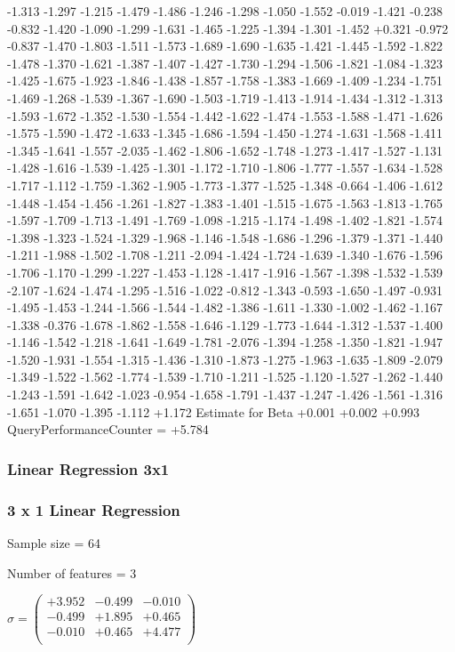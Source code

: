 \documentclass[9pt]{article}
\theoremstyle{plain}
\theoremstyle{definition}
\theoremstyle{remark}
\numberwithin{equation}{section}
\begin{document}
-1.313
-1.297
-1.215
-1.479
-1.486
-1.246
-1.298
-1.050
-1.552
-0.019
-1.421
-0.238
-0.832
-1.420
-1.090
-1.299
-1.631
-1.465
-1.225
-1.394
-1.301
-1.452
+0.321
-0.972
-0.837
-1.470
-1.803
-1.511
-1.573
-1.689
-1.690
-1.635
-1.421
-1.445
-1.592
-1.822
-1.478
-1.370
-1.621
-1.387
-1.407
-1.427
-1.730
-1.294
-1.506
-1.821
-1.084
-1.323
-1.425
-1.675
-1.923
-1.846
-1.438
-1.857
-1.758
-1.383
-1.669
-1.409
-1.234
-1.751
-1.469
-1.268
-1.539
-1.367
-1.690
-1.503
-1.719
-1.413
-1.914
-1.434
-1.312
-1.313
-1.593
-1.672
-1.352
-1.530
-1.554
-1.442
-1.622
-1.474
-1.553
-1.588
-1.471
-1.626
-1.575
-1.590
-1.472
-1.633
-1.345
-1.686
-1.594
-1.450
-1.274
-1.631
-1.568
-1.411
-1.345
-1.641
-1.557
-2.035
-1.462
-1.806
-1.652
-1.748
-1.273
-1.417
-1.527
-1.131
-1.428
-1.616
-1.539
-1.425
-1.301
-1.172
-1.710
-1.806
-1.777
-1.557
-1.634
-1.528
-1.717
-1.112
-1.759
-1.362
-1.905
-1.773
-1.377
-1.525
-1.348
-0.664
-1.406
-1.612
-1.448
-1.454
-1.456
-1.261
-1.827
-1.383
-1.401
-1.515
-1.675
-1.563
-1.813
-1.765
-1.597
-1.709
-1.713
-1.491
-1.769
-1.098
-1.215
-1.174
-1.498
-1.402
-1.821
-1.574
-1.398
-1.323
-1.524
-1.329
-1.968
-1.146
-1.548
-1.686
-1.296
-1.379
-1.371
-1.440
-1.211
-1.988
-1.502
-1.708
-1.211
-2.094
-1.424
-1.724
-1.639
-1.340
-1.676
-1.596
-1.706
-1.170
-1.299
-1.227
-1.453
-1.128
-1.417
-1.916
-1.567
-1.398
-1.532
-1.539
-2.107
-1.624
-1.474
-1.295
-1.516
-1.022
-0.812
-1.343
-0.593
-1.650
-1.497
-0.931
-1.495
-1.453
-1.244
-1.566
-1.544
-1.482
-1.386
-1.611
-1.330
-1.002
-1.462
-1.167
-1.338
-0.376
-1.678
-1.862
-1.558
-1.646
-1.129
-1.773
-1.644
-1.312
-1.537
-1.400
-1.146
-1.542
-1.218
-1.641
-1.649
-1.781
-2.076
-1.394
-1.258
-1.350
-1.821
-1.947
-1.520
-1.931
-1.554
-1.315
-1.436
-1.310
-1.873
-1.275
-1.963
-1.635
-1.809
-2.079
-1.349
-1.522
-1.562
-1.774
-1.539
-1.710
-1.211
-1.525
-1.120
-1.527
-1.262
-1.440
-1.243
-1.591
-1.642
-1.023
-0.954
-1.658
-1.791
-1.437
-1.247
-1.426
-1.561
-1.316
-1.651
-1.070
-1.395
-1.112
+1.172
Estimate for Beta
+0.001
+0.002
+0.993
QueryPerformanceCounter  =  +5.784
\subsubsection{Linear Regression 3x1}
\subsubsection{3 x 1 Linear Regression}
Sample size = 64

Number of features = 3

$\sigma = \left(
\begin{array}{
ccc}
+3.952 & -0.499 & -0.010 \\
-0.499 & +1.895 & +0.465 \\
-0.010 & +0.465 & +4.477 \\
\end{array}
\right)$ \newline 
\end{document}
